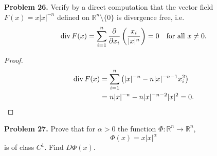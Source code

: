 \documentclass[12pt,leqno]{amsart}
\theoremstyle{definition}
\begin{document}
\medskip

\noindent
{\bf Problem 26.}
Verify by a direct computation that the vector field $F(x)=x|x|^{-n}$ defined on
$\mathbb{R}^n\setminus\{0\}$ is divergence free, i.e.
$$
{\rm div}\, F(x)=\sum_{i=1}^n \frac{\partial}{\partial x_i}\left(\frac{x_i}{|x|^n}\right) = 0
\quad
\mbox{for all $x\neq 0$.}
$$
\begin{proof}
\begin{align*}
    {\rm div}\, F(x) & = \sum^n_{i=1} \left(|x|^{-n} - n |x|^{-n-1} x_i^2\right) \\
    & = n |x|^{-n} - n |x|^{-n-2} |x|^2 = 0.
\end{align*}
\end{proof}

\medskip

\noindent
{\bf Problem 27.}
Prove that for $\alpha>0$ the function $\Phi:\mathbb{R}^n\to\mathbb{R}^n$,
$$
\Phi(x)=x|x|^\alpha
$$
is of class $C^1$. Find $D\Phi(x)$.
\end{document}
